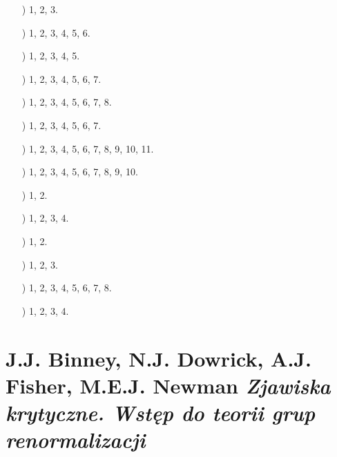 \documentclass[a4paper,11pt]{article}
\numberwithin{equation}{section}
\begin{document}
\begin{itemize}

\item[\romannumeral1)] 1, 2, 3.

\item[\romannumeral2)] 1, 2, 3, 4, 5, 6.

\item[\romannumeral3)] 1, 2, 3, 4, 5.

\item[\romannumeral4)] 1, 2, 3, 4, 5, 6, 7.

\item[\romannumeral5)] 1, 2, 3, 4, 5, 6, 7, 8.

\item[\romannumeral6)] 1, 2, 3, 4, 5, 6, 7.

\item[\romannumeral7)] 1, 2, 3, 4, 5, 6, 7, 8, 9, 10, 11.

\item[\romannumeral8)] 1, 2, 3, 4, 5, 6, 7, 8, 9, 10.

\item[\romannumeral9)] 1, 2.

\item[\romannumeral10)] 1, 2, 3, 4.

\item[\romannumeral11)] 1, 2.

\item[\romannumeral12)] 1, 2, 3.

\item[\romannumeral13)] 1, 2, 3, 4, 5, 6, 7, 8.

\item[\romannumeral14)] 1, 2, 3, 4.

\end{itemize}










\section{J.J. Binney, N.J. Dowrick, A.J. Fisher, M.E.J. Newman
  \textit{Zjawiska krytyczne. Wstęp do teorii grup
    renormalizacji}
}

\label{sec:Oznaczenia-i-konwencje}
\end{document}
